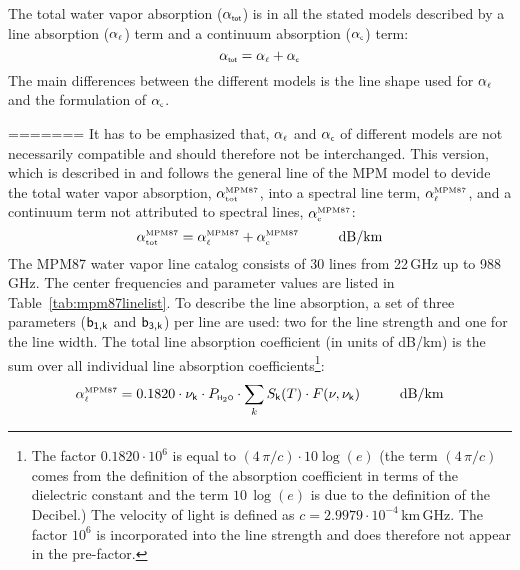 {The total water vapor absorption ($\alpha_{\mbox{\tiny \sf tot}}$) is in all the stated models 
described by a line absorption ($\alpha_{\mbox{\tiny $\ell$}}$) term and a continuum absorption 
($\alpha_{\mbox{\tiny \sf c}}$) term: 
\begin{equation}
  \label{eq:h2o:totabs}
  \alpha_{\mbox{\tiny \sf tot}} = \alpha_{\mbox{\tiny $\ell$}} + \alpha_{\mbox{\tiny \sf c}}
\end{equation}
The main differences between the different models is the line shape used for 
$\alpha_{\mbox{\tiny $\ell$}}$ and the formulation of $\alpha_{\mbox{\tiny \sf c}}$.

=======
It has to be emphasized that, $\alpha_{\mbox{\tiny $\ell$}}$ and $\alpha_{\mbox{\tiny \sf c}}$ of different
models are not necessarily compatible and should therefore not be interchanged.
%
%
%
% 
\label{leveld:mpm87}
This version, which is described in \cite{liebeandlayton:87} and 
follows the general line of the MPM model to devide the total water vapor absorption, 
$\alpha^{\mbox{\rm \tiny MPM87}}_{\mbox{\tiny tot}}$, into a spectral line term, $\alpha^{\mbox{\rm \tiny MPM87}}_{\mbox{\tiny $\ell$}}$, and a 
continuum term not attributed to spectral lines, $\alpha^{\mbox{\rm \tiny MPM87}}_{\mbox{\tiny c}}$:
\begin{equation}
  \label{eq:mpm87_abs}
  \alphampmotot = \alphampmol + \alphampmoc\hspace*{10mm}\mbox{dB/km}
\end{equation}
%
%
\label{levele:h2o_mpm87_lines}
The MPM87 \cite{liebeandlayton:87} water vapor line catalog consists 
of 30 lines from 22\,GHz up to 988\,GHz. The center frequencies and parameter 
values are listed in Table~\ref{tab:mpm87linelist}. To describe the line 
absorption, a set of three parameters ($\sf b_{\sf 1,k}$ and $\sf b_{\sf 3,k}$) per line are used: two 
for the line strength and one for the line width. The total line 
absorption coefficient (in units of dB/km) is the sum over all 
individual line absorption coefficients\footnote{The factor 
  $0.1820 \cdot 10^{6}$ is equal to $(4\,\pi/c)\cdot 10\log{(e)}$
  (the term $(4\,\pi/c)$ comes from the definition of the absorption
  coefficient in terms of the dielectric constant and the term 
  $10\,\log{(e)}$ is due to the definition of the Decibel.) The
  velocity of light is defined as $c=2.9979\cdot 10^{-4}$\,km\,GHz. 
  The factor $10^{6}$ is incorporated into the line strength and 
  does therefore not appear in the pre-factor.}:
\begin{equation}
  \label{eq:mpm87:absline}
  \alphampmol = 0.1820 \cdot \nuk \cdot \phzo \cdot 
  \sum_{k}{\inten \cdot \shape}\hspace*{10mm}\mbox{dB/km}

\end{equation}}
